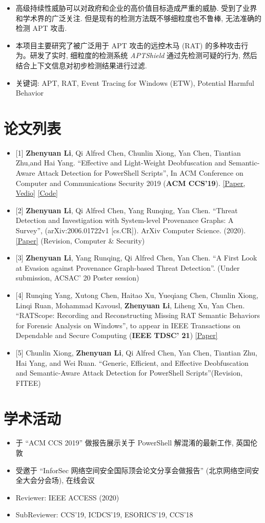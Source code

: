 \documentclass{resume}
\begin{document}
\begin{itemize}
  \item 高级持续性威胁可以对政府和企业的高价值目标造成严重的威胁. 受到了业界和学术界的广泛关注. 但是现有的检测方法既不够细粒度也不鲁棒, 无法准确的检测 APT 攻击.
  \item 本项目主要研究了被广泛用于 APT 攻击的远控木马 (RAT) 的多种攻击行为。研发了实时, 细粒度的检测系统 {\it APTShield} 通过先检测可疑的行为, 然后结合上下文信息对初步检测结果进行过滤.
  \item 关键词: APT, RAT, Event Tracing for Windows (ETW), Potential Harmful Behavior
\end{itemize} 


\section{论文列表}
\begin{itemize}[parsep=0.2ex]
\item {[1]} {\bf Zhenyuan Li}, Qi Alfred Chen, Chunlin Xiong, Yan Chen, Tiantian Zhu,and Hai Yang. ``Effective and Light-Weight Deobfuscation and Semantic-Aware Attack Detection for PowerShell Scripts'', In ACM Conference on Computer and Communications Security 2019 ({\bf ACM CCS'19}). \href{https://dl.acm.org/doi/10.1145/3319535.3363187}{[Paper, Vedio]} \href{https://github.com/li-zhenyuan/PowerShellDeobfuscation}{[Code]}
\item {[2]} {\bf Zhenyuan Li}, Qi Alfred Chen, Yang Runqing, Yan Chen. ``Threat Detection and Investigation with System-level Provenance Graphs: A Survey'', (arXiv:2006.01722v1 [cs.CR]). ArXiv Computer Science. (2020). \href{https://arxiv.org/pdf/2006.01722}{[Paper]} (Revision, {Computer \& Security})
\item {[3]} {\bf Zhenyuan Li}, Yang Runqing, Qi Alfred Chen, Yan Chen. ``A First Look at Evasion against Provenance Graph-based Threat Detection''. (Under submission, ACSAC' 20 Poster session)
\item {[4]} Runqing Yang, Xutong Chen, Haitao Xu, Yueqiang Chen, Chunlin Xiong, Linqi Ruan, Mohammad Kavousl, {\bf Zhenyuan Li}, Liheng Xu, Yan Chen. ``RATScope: Recording and Reconstructing Missing RAT Semantic Behaviors for Forensic Analysis on Windows'', to appear in IEEE Transactions on Dependable and Secure Computing ({\bf IEEE TDSC' 21}) \href{https://doi.org/10.1109/TDSC.2020.3032570}{[Paper]}
\item {[5]} Chunlin Xiong, {\bf Zhenyuan Li}, Qi Alfred Chen, Yan Chen, Tiantian Zhu, Hai Yang, and Wei Ruan. ``Generic, Efficient, and Effective Deobfuscation and Semantic-Aware Attack Detection for PowerShell Scripts''(Revision, FITEE)
\end{itemize}


\section{学术活动}
\begin{itemize}[parsep=0.2ex]
  \item 于 ``ACM CCS 2019'' 做报告展示关于 PowerShell 解混淆的最新工作, 英国伦敦
  \item 受邀于 ``InforSec 网络空间安全国际顶会论文分享会做报告'' (北京网络空间安全大会分会场), 在线会议
  \item Reviewer: IEEE ACCESS (2020)
  \item SubReviewer: CCS'19, ICDCS'19, ESORICS'19, CCS'18
\end{itemize}
\end{document}
